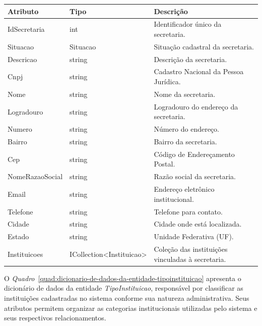 \begin{quadro}[H]
\caption[Dicionário de dados da entidade Secretaria]{Dicionário de dados da entidade Secretaria}
\label{quad:dicionario-de-dados-da-entidade-secretaria}

\begin{tabular}{|p{}|p{}|p{}|}
\hline
\textbf{Atributo} & \textbf{Tipo} & \textbf{Descrição} \\ 
\hline
IdSecretaria & int & Identificador único da secretaria. \\ 
\hline
Situacao & Situacao & Situação cadastral da secretaria. \\ 
\hline
Descricao & string & Descrição da secretaria. \\ 
\hline
Cnpj & string & Cadastro Nacional da Pessoa Jurídica. \\ 
\hline
Nome & string & Nome da secretaria. \\ 
\hline
Logradouro & string & Logradouro do endereço da secretaria. \\ 
\hline
Numero & string & Número do endereço. \\ 
\hline
Bairro & string & Bairro da secretaria. \\ 
\hline
Cep & string & Código de Endereçamento Postal. \\ 
\hline
NomeRazaoSocial & string & Razão social da secretaria. \\ 
\hline
Email & string & Endereço eletrônico institucional. \\ 
\hline
Telefone & string & Telefone para contato. \\ 
\hline
Cidade & string & Cidade onde está localizada. \\ 
\hline
Estado & string & Unidade Federativa (UF). \\ 
\hline
Instituicoes & ICollection<Instituicao> & Coleção das instituições vinculadas à secretaria. \\ 
\hline
\end{tabular}


\end{quadro}



O \textit{Quadro}~\ref{quad:dicionario-de-dados-da-entidade-tipoinstituicao} apresenta o dicionário de dados da entidade \textit{TipoInstituicao}, responsável por classificar as instituições cadastradas no sistema conforme sua natureza administrativa. Seus atributos permitem organizar as categorias institucionais utilizadas pelo sistema e seus respectivos relacionamentos.

